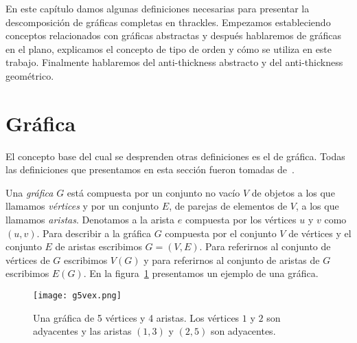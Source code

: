 En este capítulo damos algunas definiciones necesarias para presentar la
descomposición de gráficas completas en thrackles.
Empezamos estableciendo conceptos relacionados con gráficas abstractas y después
hablaremos de gráficas en el plano, explicamos el concepto de tipo de orden y cómo
se utiliza en este trabajo. Finalmente hablaremos del anti-thickness abstracto
y del anti-thickness geométrico.

\section{Gráfica}
El concepto base del cual se desprenden otras definiciones es el de gráfica.
Todas las definiciones que presentamos en esta sección fueron tomadas de~\cite{Chartrand2008}.

Una \emph{gráfica} $G$ está compuesta por un conjunto no vacío $V$ de objetos a los que llamamos \emph{vértices}
y por un conjunto $E$, de parejas de elementos de $V$, a los que llamamos \emph{aristas}. Denotamos
a la arista $e$ compuesta por los vértices $u$ y $v$ como $(u,v)$. Para describir a la gráfica $G$
compuesta por el conjunto $V$ de vértices y el conjunto $E$ de aristas escribimos $G=(V,E)$.
Para referirnos al conjunto de vértices de $G$ escribimos $V(G)$ y para referirnos
al conjunto de aristas de $G$ escribimos $E(G)$. En la figura~\ref{fig:g5vex} presentamos
un ejemplo de una gráfica.

\begin{figure}[t]
  \centering
  \texttt{[image: g5vex.png]}
  \caption{Una gráfica de 5 vértices y 4 aristas. Los vértices $1$ y $2$
  son adyacentes y las aristas $(1,3)$ y $(2,5)$ son adyacentes.}
  \label{fig:g5vex}
\end{figure}

